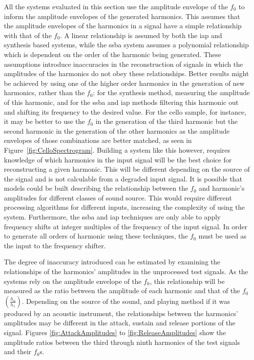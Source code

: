 		All the systems evaluated in this section use the amplitude envelope of the $f_{0}$ to inform the amplitude
		envelopes of the generated harmonics. This assumes that the amplitude envelopes of the harmonics in a
		signal have a simple relationship with that of the $f_{0}$. A linear relationship is assumed by both the
		\acrshort{iap} and synthesis based systems, while the \acrshort{ssba} system assumes a polynomial
		relationship which is dependent on the order of the harmonic being generated. These assumptions introduce
		inaccuracies in the reconstruction of signals in which the amplitudes of the harmonics do not obey these
		relationships. Better results might be achieved by using one of the higher order harmonics in the
		generation of new harmonics, rather than the $f_{0}$: for the synthesis method, measuring the amplitude of
		this harmonic, and for the \acrshort{ssba} and \acrshort{iap} methods filtering this harmonic out and
		shifting its frequency to the desired value. For the cello sample, for instance, it may be better to use
		the $f_{0}$ in the generation of the third harmonic but the second harmonic in the generation of the other
		harmonics as the amplitude envelopes of those combinations are better matched, as seen in
		Figure~\ref{fig:CelloSpectrogram}. Building a system like this however, requires knowledge of which
		harmonics in the input signal will be the best choice for reconstructing a given harmonic. This will be
		different depending on the source of the signal and is not calculable from a degraded input signal. It is
		possible that models could be built describing the relationship between the $f_{0}$ and harmonic's
		amplitudes for different classes of sound source. This would require different processing algorithms for
		different inputs, increasing the complexity of using the system. Furthermore, the \acrshort{ssba} and
		\acrshort{iap} techniques are only able to apply frequency shifts at integer multiples of the frequency of
		the input signal. In order to generate all orders of harmonic using these techniques, the $f_{0}$ must be
		used as the input to the frequency shifter.
		
		The degree of inaccuracy introduced can be estimated by examining the relationships of the harmonics'
		amplitudes in the unprocessed test signals. As the systems rely on the amplitude envelope of the $f_{0}$,
		this relationship will be measured as the ratio between the amplitude of each harmonic and that of the
		$f_{0}$ $\left(\frac{h_{n}}{h_{1}}\right)$. Depending on the source of the sound, and playing method if
		it was produced by an acoustic instrument, the relationships between the harmonics' amplitudes may be
		different in the attack, sustain and release portions of the signal. Figures \ref{fig:AttackAmplitudes} to
		\ref{fig:ReleaseAmplitudes} show the amplitude ratios between the third through ninth harmonics of the test
		signals and their $f_{0}$s.

